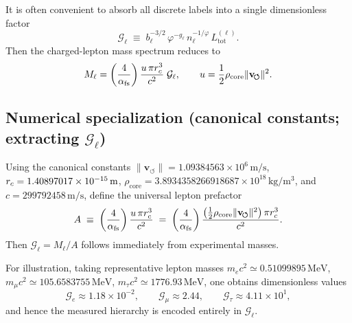 \documentclass[10pt]{article}
\newcommand{\vswirl}{\mathbf{v}_{\!\boldsymbol{\circlearrowleft}}}
\begin{document}
        It is often convenient to absorb all discrete labels into a single dimensionless factor
        \begin{equation}
            \mathcal{G}_\ell \;\equiv\;
            b_\ell^{-3/2}\,\varphi^{-g_\ell}\,n_\ell^{-1/\varphi}\,L_{\text{tot}}^{(\ell)}.
            \label{eq:Gell_def}
        \end{equation}
        Then the charged-lepton mass spectrum reduces to
        \begin{equation}
            M_\ell=
            \left(\frac{4}{\alpha_{\rm fs}}\right)\frac{u\,\pi \rc^3}{c^2}\;\mathcal{G}_\ell,
            \qquad
            u=\frac12\rho_{\text{core}}\|\vswirl\|^2.
            \label{eq:lepton_mass_Gell}
        \end{equation}

    \subsection{Numerical specialization (canonical constants; extracting $\mathcal{G}_\ell$)}

        Using the canonical constants $\|\vswirl\|=1.09384563\times10^6\,\mathrm{m/s}$,
        $r_c=1.40897017\times10^{-15}\,\mathrm{m}$,
        $\rho_{\text{core}}=3.8934358266918687\times10^{18}\,\mathrm{kg/m^3}$,
        and $c=299792458\,\mathrm{m/s}$, define the universal lepton prefactor
        \begin{equation}
            A \;\equiv\; \left(\frac{4}{\alpha_{\rm fs}}\right)\frac{u\,\pi \rc^3}{c^2}
            \;=\;\left(\frac{4}{\alpha_{\rm fs}}\right)\frac{\left(\frac12\rho_{\text{core}}\|\vswirl\|^2\right)\pi \rc^3}{c^2}.
            \label{eq:A_prefactor}
        \end{equation}
        Then $\mathcal{G}_\ell = M_\ell/A$ follows immediately from experimental masses.

        For illustration, taking representative lepton masses
        $m_e c^2\simeq 0.51099895\,\mathrm{MeV}$,
        $m_\mu c^2\simeq 105.6583755\,\mathrm{MeV}$,
        $m_\tau c^2\simeq 1776.93\,\mathrm{MeV}$,
        one obtains dimensionless values
        \begin{equation}
            \mathcal{G}_e \approx 1.18\times 10^{-2},\qquad
            \mathcal{G}_\mu \approx 2.44,\qquad
            \mathcal{G}_\tau \approx 4.11\times 10^{1},
            \label{eq:Gell_numbers}
        \end{equation}
        and hence the measured hierarchy is encoded entirely in $\mathcal{G}_\ell$.
\end{document}
